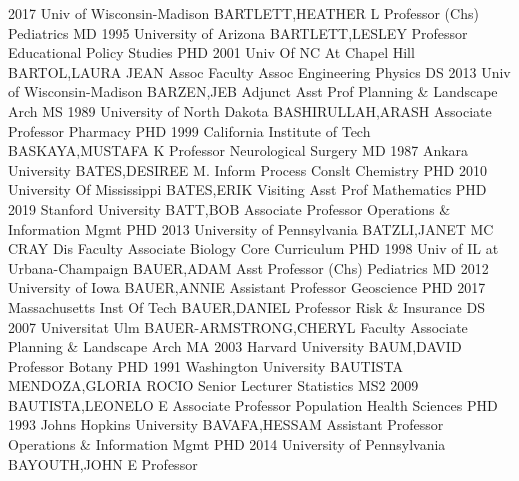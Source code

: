\documentclass[
]{article}
\begin{document}
2017 Univ of Wisconsin-Madison \textbar BARTLETT,HEATHER L \textbar{}
 \textbar Professor (Chs) \textbar Pediatrics \textbar MD
1995 University of Arizona \textbar BARTLETT,LESLEY \textbar{}
 \textbar Professor \textbar Educational Policy Studies
\textbar PHD 2001 Univ Of NC At Chapel Hill \textbar BARTOL,LAURA JEAN
\textbar{}  \textbar Assoc Faculty Assoc \textbar Engineering
Physics \textbar DS 2013 Univ of Wisconsin-Madison \textbar BARZEN,JEB
\textbar{}  \textbar Adjunct Asst Prof \textbar Planning \&
Landscape Arch \textbar MS 1989 University of North Dakota
\textbar BASHIRULLAH,ARASH \textbar{}  \textbar Associate
Professor \textbar Pharmacy \textbar PHD 1999 California Institute of
Tech \textbar BASKAYA,MUSTAFA K \textbar{} 
\textbar Professor \textbar Neurological Surgery \textbar MD 1987 Ankara
University \textbar BATES,DESIREE M. \textbar{} 
\textbar Inform Process Conslt \textbar Chemistry \textbar PHD 2010
University Of Mississippi \textbar BATES,ERIK \textbar{} 
\textbar Visiting Asst Prof \textbar Mathematics \textbar PHD 2019
Stanford University \textbar BATT,BOB \textbar{} 
\textbar Associate Professor \textbar Operations \& Information Mgmt
\textbar PHD 2013 University of Pennsylvania \textbar BATZLI,JANET MC
CRAY \textbar{}  \textbar Dis Faculty Associate
\textbar Biology Core Curriculum \textbar PHD 1998 Univ of IL at
Urbana-Champaign \textbar BAUER,ADAM \textbar{} 
\textbar Asst Professor (Chs) \textbar Pediatrics \textbar MD 2012
University of Iowa \textbar BAUER,ANNIE \textbar{} 
\textbar Assistant Professor \textbar Geoscience \textbar PHD 2017
Massachusetts Inst Of Tech \textbar BAUER,DANIEL \textbar{} 
\textbar Professor \textbar Risk \& Insurance \textbar DS 2007
Universitat Ulm \textbar BAUER-ARMSTRONG,CHERYL \textbar{} 
\textbar Faculty Associate \textbar Planning \& Landscape Arch
\textbar MA 2003 Harvard University \textbar BAUM,DAVID \textbar{}
 \textbar Professor \textbar Botany \textbar PHD 1991
Washington University \textbar BAUTISTA MENDOZA,GLORIA ROCIO \textbar{}
 \textbar Senior Lecturer \textbar Statistics \textbar MS2
2009 \textbar BAUTISTA,LEONELO E \textbar{} 
\textbar Associate Professor \textbar Population Health Sciences
\textbar PHD 1993 Johns Hopkins University \textbar BAVAFA,HESSAM
\textbar{}  \textbar Assistant Professor \textbar Operations
\& Information Mgmt \textbar PHD 2014 University of Pennsylvania
\textbar BAYOUTH,JOHN E \textbar{}  \textbar Professor
\end{document}
